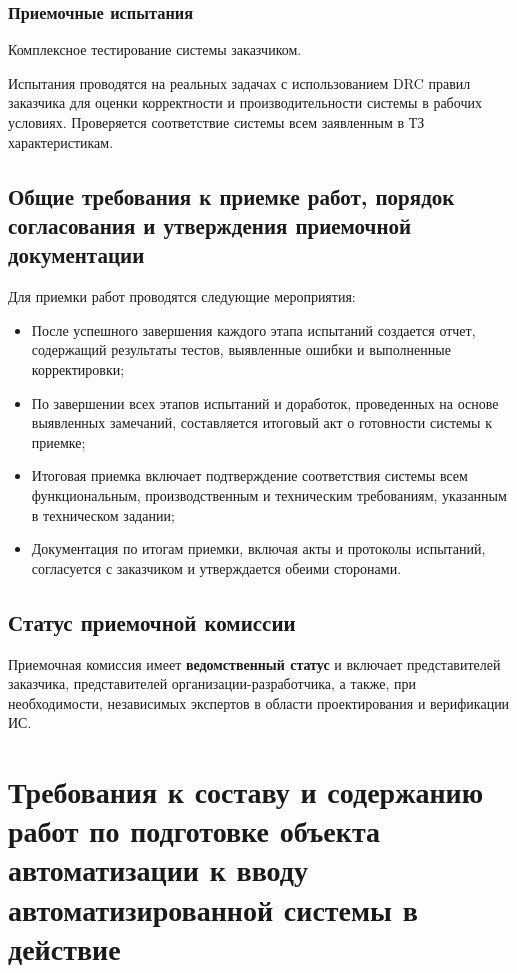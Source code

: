 \subsubsection{Приемочные испытания}

Комплексное тестирование системы заказчиком.

Испытания проводятся на реальных задачах
с использованием DRC правил заказчика для оценки корректности
и производительности системы в рабочих условиях.
Проверяется соответствие системы всем заявленным в ТЗ характеристикам.

\subsection{Общие требования к приемке работ,
	порядок согласования и утверждения приемочной документации}

Для приемки работ проводятся следующие мероприятия:

\begin{itemize}
	\item После успешного завершения каждого этапа испытаний создается отчет,
		содержащий результаты тестов,
		выявленные ошибки и выполненные корректировки;
	\item По завершении всех этапов испытаний и доработок,
		проведенных на основе выявленных замечаний,
		составляется итоговый акт о готовности системы к приемке;
	\item Итоговая приемка включает подтверждение соответствия системы
		всем функциональным, производственным и техническим требованиям,
		указанным в техническом задании;
	\item Документация по итогам приемки, включая акты и протоколы испытаний,
		согласуется с заказчиком и утверждается обеими сторонами.
\end{itemize}

\subsection{Статус приемочной комиссии}

Приемочная комиссия имеет \textbf{ведомственный статус}
и включает представителей заказчика,
представителей организации-разработчика, а также, при необходимости,
независимых экспертов в области проектирования и верификации ИС.

\section{Требования к составу и содержанию работ по подготовке
	объекта автоматизации к вводу автоматизированной системы в действие}

